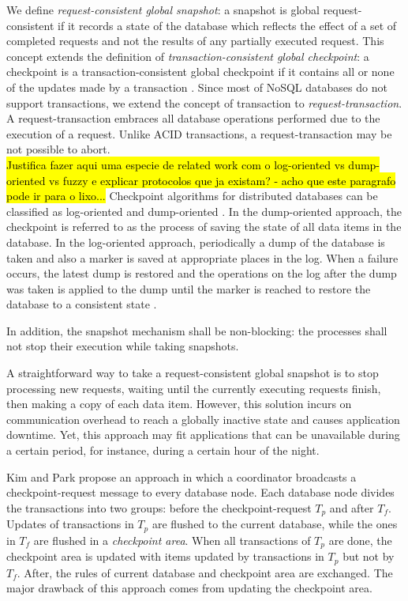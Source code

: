 We define \textit{request-consistent global snapshot}: a snapshot is global request-consistent if it records a state of the database which reflects the effect of a set of completed requests and not the results of any partially executed request. This concept extends the definition of \emph{transaction-consistent global checkpoint}: a checkpoint is a transaction-consistent global checkpoint if it contains all or none of the updates made by a transaction \cite{global-checkpoint}. Since most of \acs{NoSQL} databases do not support transactions, we extend the concept of transaction to \textit{request-transaction}. A request-transaction embraces all database operations performed due to the execution of a request. Unlike \ac{ACID} transactions, a request-transaction may be not possible to abort.\\ 



\hl{Justifica fazer aqui uma especie de related work com o log-oriented vs dump-oriented vs fuzzy e explicar protocolos que ja existam? - acho que este paragrafo pode ir para o lixo...} Checkpoint algorithms for distributed databases can be classified as log-oriented and dump-oriented \cite{checkpoint-survey}. In the dump-oriented approach, the checkpoint is referred to as the process of saving the state of all data items in the database. In the log-oriented approach, periodically a dump of the database is taken and also a marker is saved at appropriate places in the log. When a failure occurs, the latest dump is restored and the operations on the log after the dump was taken is applied to the dump until the marker is reached to restore the database to a consistent state \cite{global-checkpoint}.


In addition, the snapshot mechanism shall be non-blocking: the processes shall not stop their execution while taking snapshots.  

A straightforward way to take a request-consistent global snapshot is to stop processing new requests, waiting until the currently executing requests finish, then making a copy of each data item. However, this solution incurs on communication overhead to reach a globally inactive state and causes application downtime. Yet, this approach may fit applications that can be unavailable during a certain period, for instance, during a certain hour of the night. 


Kim and Park \cite{kim_checkpoint} propose an approach in which a coordinator broadcasts a checkpoint-request message to every database node. Each database node divides the transactions into two groups: before the checkpoint-request $T_p$ and after $T_f$. Updates of transactions in $T_p$ are flushed to the current database, while the ones in $T_f$ are flushed in a \emph{checkpoint area}. When all transactions of $T_p$ are done, the checkpoint area is updated with items updated by transactions in $T_p$ but not by $T_f$. After, the rules of current database and checkpoint area are exchanged. The major drawback of this approach comes from updating the checkpoint area.



